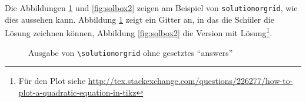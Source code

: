 Die Abbildungen \ref{fig:solbox1} und \ref{fig:solbox2} zeigen am Beispiel von \texttt{solutionorgrid}, wie dies aussehen kann. Abbildung \ref{fig:solbox1} zeigt ein Gitter an, in das die Schüler die Lösung zeichnen können, Abbildung \ref{fig:solbox2} die Version mit Lösung\footnote{Für den Plot siehe \url{http://tex.stackexchange.com/questions/226277/how-to-plot-a-quadratic-equation-in-tikz}}.

\begin{figure}
\caption{Ausgabe von \texttt{\textbackslash solutionorgrid} ohne gesetztes \enquote{answers}}\label{fig:solbox1}
\end{figure}

